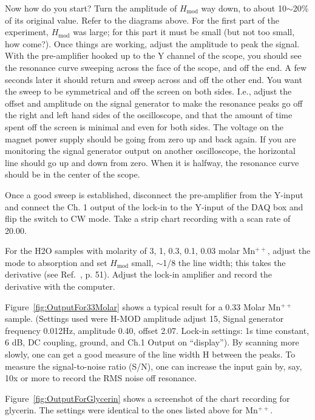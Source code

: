 \documentclass{../lab}
\begin{document}
Now how do you start? Turn the amplitude of $H_\text{mod}$ way down, to about 10$\sim$20\% of its original value. Refer to the diagrams above. For the first part of the experiment, $H_\text{mod}$ was large; for this part it must be small (but not too small, how come?). Once things are working, adjust the amplitude to peak the signal. With the pre-amplifier hooked up to the Y channel of the scope, you should see the resonance curve sweeping across the face of the scope, and off the end. A few seconds later it should return and sweep across and off the other end. You want the sweep to be symmetrical and off the screen on both sides. I.e., adjust the offset and amplitude on the signal generator to make the resonance peaks go off the right and left hand sides of the oscilloscope, and that the amount of time spent off the screen is minimal and even for both sides. The voltage on the magnet power supply should be going from zero up and back again. If you are monitoring the signal generator output on another oscilloscope, the horizontal line should go up and down from zero. When it is halfway, the resonance curve should be in the center of the scope.

Once a good sweep is established, disconnect the pre-amplifier from the Y-input and connect the Ch. 1 output of the lock-in to the Y-input of the DAQ box and flip the switch to CW mode. Take a strip chart recording with a scan rate of 20.00.

For the H2O samples with molarity of 3, 1, 0.3, 0.1, 0.03 molar Mn$^{++}$, adjust the mode to absorption and set $H_\text{mod}$ small, $\sim$1/8 the line width; this takes the derivative (see Ref.~\cite{Liboff}, p. 51). Adjust the lock-in amplifier and record the derivative with the computer.

Figure~\ref{fig:OutputFor33Molar} shows a typical result for a 0.33 Molar  Mn$^{++}$ sample. (Settings used were H-MOD amplitude adjust 15, Signal generator frequency 0.012Hz, amplitude 0.40, offset 2.07. Lock-in settings: 1s time constant, 6 dB, DC coupling, ground, and Ch.1 Output on ``display''). By scanning more slowly, one can get a good measure of the line width H between the peaks. To measure the signal-to-noise ratio (S/N), one can increase the input gain by, say, 10x or more to record the RMS noise off resonance.

Figure~\ref{fig:OutputForGlycerin} shows a screenshot of the chart recording for glycerin. The settings were identical to the ones listed above for Mn$^{++}$.
\end{document}
